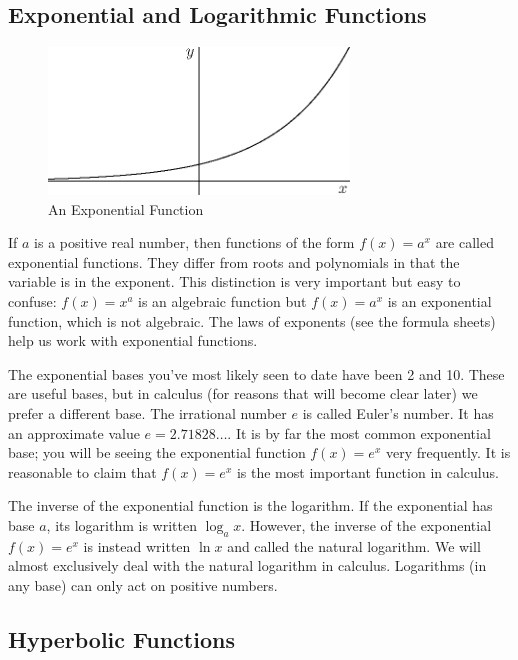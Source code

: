\documentclass[fleqn]{report}
\begin{document}
\subsection*{Exponential and Logarithmic Functions}

\begin{figure}[t]
\centering
\includegraphics[width=8cm]{figure31.eps}
\caption{An Exponential Function}
\label{An Exponential Function}
\end{figure}

If $a$ is a positive real number, then functions of the form
$f(x) = a^x$ are called exponential functions. They differ
from roots and polynomials in that the variable is in the
exponent. This distinction is very important but easy to
confuse: $f(x) = x^a$ is an algebraic function but $f(x) =
a^x$ is an exponential function, which is not algebraic.
The laws of exponents (see the formula sheets) help us work
with exponential functions.

The exponential bases you've most likely seen to
date have been 2 and 10. These are useful bases, but in
calculus (for reasons that will become clear later) we prefer
a different base. The irrational number $e$ is called Euler's
number. It has an approximate
value $e = 2.71828\ldots$. It is by far the most common
exponential base; you will be seeing the exponential function
$f(x) = e^x$ very frequently. It is reasonable to claim that 
$f(x) = e^x$ is the most important function in calculus.

The inverse of the exponential function is the logarithm. If the
exponential has base $a$, its logarithm is written
$\log_a x$. However, the inverse of the exponential $f(x) =
e^x$ is instead written $\ln x$ and
called the natural logarithm. We
will almost exclusively deal with the natural logarithm in
calculus. Logarithms (in any base) can only act on positive
numbers.

\subsection*{Hyperbolic Functions}
\end{document}

